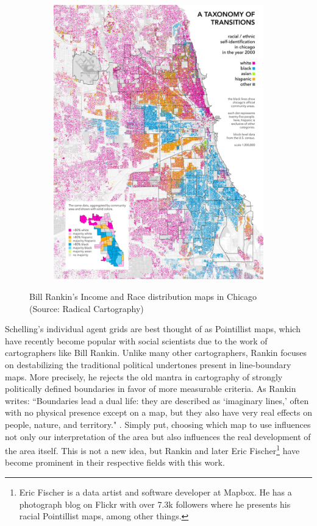 {\begin{figure}[!h]
\begin{subfigure}{.5\textwidth}
\includegraphics[scale=.35]{figures/chicagodots_race_big.jpg}
\end{subfigure}
\caption[Bill Rankin's Income and Race Maps of Chicago]{Bill Rankin's Income and Race distribution maps in Chicago (Source: Radical Cartography)}
\label{fig:rankin}
\end{figure}

Schelling's individual agent grids are best thought of as Pointillist maps, which have recently become popular with social scientists due to the work of cartographers like Bill Rankin. Unlike many other cartographers, Rankin focuses on destabilizing the traditional political undertones present in line-boundary maps. More precisely, he rejects the old mantra in cartography of strongly politically defined boundaries in favor of more measurable criteria. As Rankin writes: ``Boundaries lead a dual life: they are described as `imaginary lines,' often with no physical presence except on a map, but they also have very real effects on people, nature, and territory." \cite{rankin10}. Simply put, choosing which map to use influences not only our interpretation of the area but also influences the real development of the area itself. This is not a new idea, but Rankin and later Eric Fischer\footnote{Eric Fischer is a data artist and software developer at Mapbox. He has a photograph blog on Flickr with over 7.3k followers where he presents his racial Pointillist maps, among other things.} have become prominent in their respective fields with this work. 

}

